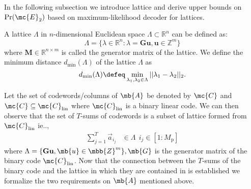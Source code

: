 \documentclass[final,onecolumn,12pt]{IEEEtran}
\def\dmin{d_{\mathrm{min}}}
\def\Pr{\mathrm{Pr}}
\begin{document}
In the following subsection we introduce lattice and derive upper bounds on $\Pr(\mc{E}_2)$ based on maximum-likelihood decoder for lattices.
\begin{definition}
A lattice $\Lambda$ in $n$-dimensional Euclidean space $\Lambda\subset \mathbb{R}^{n}$ can be defined as:
\begin{equation}
\Lambda =\{\lambda\in\mathbb{R}^{n}:\lambda=\mathbf{G}\mathbf{u},\mathbf{u}\in \mathbb{Z}^{m}\}
\end{equation}
where $\mathbf{M}\in\mathbb{R}^{n \times m}$ is called the generator matrix of the lattice. We define the minimum distance $\dmin(\Lambda)$ of the lattice $\Lambda$ as 
\[
\dmin(\Lambda)\defeq \min_{\lambda_1, \lambda_2\in\Lambda } ||\lambda_1-\lambda_2||_2.
\]
\end{definition}

Let the set of codewords/columns of $\mb{A}$ be denoted by $\mc{C}$ and $\mc{C}\subseteq \mc{C}_{\text{lin}}$ where $\mc{C}_{\text{lin}}$ is a binary linear code. We can then observe that the set of $T$-sums of codewords is a subset of lattice formed from $\mc{C}_{\text{lin}}$ ie..,
\begin{align*}
\sum_{j=1}^{T}\vec{a}_{i_j}&\in \Lambda ~~ i_j\in[1:M_\mathrm{p}]
\end{align*}
where $\Lambda =\{\mathbf{G}\mathbf{u},\mb{u}\in \mbb{Z}^{m}\}, \mb{G}$ is the generator matrix of the binary code $\mc{C}_{\text{lin}}$. Now that the connection between the $T$-sums of the binary code and the lattice in which they are contained in is established we formalize the two requirements on $\mb{A}$ mentioned above.
\end{document}
